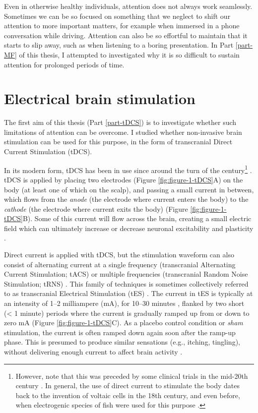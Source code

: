 \documentclass[11pt,]{memoir}
\let\rmarkdownfootnote\footnote%
\def\footnote{\protect\rmarkdownfootnote}
\begin{document}
Even in otherwise healthy individuals, attention does not always work seamlessly. Sometimes we can be so focused on something that we neglect to shift our attention to more important matters, for example when immersed in a phone conversation while driving. Attention can also be so effortful to maintain that it starts to slip away, such as when listening to a boring presentation. In Part \ref{part-MF} of this thesis, I attempted to investigated why it is so difficult to sustain attention for prolonged periods of time.

\hypertarget{electrical-brain-stimulation}{%
\section{Electrical brain stimulation}\label{electrical-brain-stimulation}}

The first aim of this thesis (Part \ref{part-tDCS}) is to investigate whether such limitations of attention can be overcome. I studied whether non-invasive brain stimulation can be used for this purpose, in the form of transcranial Direct Current Stimulation (tDCS).

In its modern form, tDCS has been in use since around the turn of the century\footnote{However, note that this was preceded by some clinical trials in the mid-20th century \autocite[e.g.,][]{Redfearn1964}. In general, the use of direct current to stimulate the body dates back to the invention of voltaic cells in the 18th century, and even before, when electrogenic species of fish were used for this purpose \autocites{Guleyupoglu2013}{Priori2003}{Sarmiento2016}.} \autocites{Priori1998}{Nitsche2000}. tDCS is applied by placing two electrodes (Figure \ref{fig:figure-1-tDCS}A) on the body (at least one of which on the scalp), and passing a small current in between, which flows from the \emph{anode} (the electrode where current enters the body) to the \emph{cathode} (the electrode where current exits the body) \autocite{Gebodh2019a} (Figure \ref{fig:figure-1-tDCS}B). Some of this current will flow across the brain, creating a small electric field which can ultimately increase or decrease neuronal excitability and plasticity \autocite{Reato2019}.

Direct current is applied with tDCS, but the stimulation waveform can also consist of alternating current at a single frequency (transcranial Alternating Current Stimulation; tACS) or multiple frequencies (transcranial Random Noise Stimulation; tRNS) \autocite{Fertonani2017}. This family of techniques is sometimes collectively referred to as transcranial Electrical Stimulation (tES) \autocite{Gebodh2019a}. The current in tES is typically at an intensity of 1--2 milliampere (mA), for 10--30 minutes \autocite{Bikson2016}, flanked by two short (\textless{} 1 minute) periods where the current is gradually ramped up from or down to zero mA (Figure \ref{fig:figure-1-tDCS}C). As a placebo control condition or \emph{sham} stimulation, the current is often ramped down again soon after the ramp-up phase. This is presumed to produce similar sensations (e.g., itching, tingling), without delivering enough current to affect brain activity \autocite{Fonteneau2019}.
\end{document}
